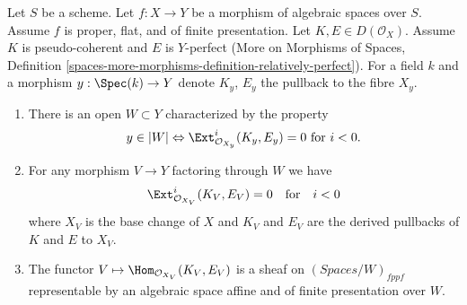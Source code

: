 \begin{lemma}
\label{lemma-complexes-open-neg-exts-vanishing}
Let $S$ be a scheme.
Let $f : X \to Y$ be a morphism of algebraic spaces over $S$.
Assume $f$ is proper, flat, and of finite presentation.
Let $K, E \in D(\mathcal{O}_X)$. Assume $K$ is pseudo-coherent
and $E$ is $Y$-perfect (More on Morphisms of Spaces, Definition
\ref{spaces-more-morphisms-definition-relatively-perfect}).
For a field $k$ and a morphism $y : \Spec(k) \to Y$ denote $K_y$, $E_y$
the pullback to the fibre $X_y$.
\begin{enumerate}
\item There is an open $W \subset Y$ characterized by the property
$$
y \in |W|
\Leftrightarrow
\Ext^i_{\mathcal{O}_{X_y}}(K_y, E_y) = 0
\text{ for }i < 0.
$$
\item For any morphism $V \to Y$ factoring through $W$ we have
$$
\Ext^i_{\mathcal{O}_{X_V}}(K_V, E_V) = 0
\quad\text{for}\quad i < 0
$$
where $X_V$ is the base change of $X$ and $K_V$ and $E_V$
are the derived pullbacks of $K$ and $E$ to $X_V$.
\item The functor $V \mapsto \Hom_{\mathcal{O}_{X_V}}(K_V, E_V)$
is a sheaf on $(\textit{Spaces}/W)_{fppf}$ representable by an
algebraic space affine and of finite presentation over $W$.
\end{enumerate}
\end{lemma}

